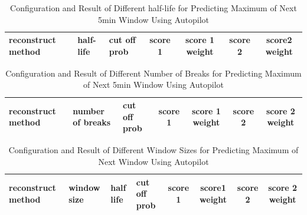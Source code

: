 \documentclass{article}
\begin{document}
\begin{longtable}[htbp]{l|l|l|*{4}{c}}
  \caption{Configuration and Result of Different half-life for Predicting Maximum of Next 5min Window Using Autopilot}
  \label{tab:tab1.11.2} \\
  \textbf{reconstruct method} & \textbf{half-life} & \textbf{cut off prob} &
  \textbf{score 1} & \textbf{score 1 weight} & \textbf{score 2} & \textbf{score2
  weight} \\
  \hline
\end{longtable}

\begin{longtable}[htbp]{l|l|l|*{4}{c}}
  \caption{Configuration and Result of Different Number of Breaks for Predicting Maximum of Next 5min Window Using Autopilot}
  \label{tab:tab1.11.3} \\
  \textbf{reconstruct method} & \textbf{number of breaks} & \textbf{cut off
  prob} & \textbf{score 1} & \textbf{score 1 weight} & \textbf{score 2} &
  \textbf{score 2 weight} \\ 
  \hline
\end{longtable}

\begin{longtable}[htbp]{l|l|l|l|*{4}{c}}
  \caption{Configuration and Result of Different Window Sizes for Predicting Maximum of Next Window Using Autopilot}
  \label{tab:tab1.11.4}\\
  \textbf{reconstruct method} & \textbf{window size} & \textbf{half life} &
  \textbf{cut off prob} & \textbf{score 1} & \textbf{score1 weight} &
  \textbf{score 2} & \textbf{score 2 weight} \\
  \hline
\end{longtable}
\end{document}
